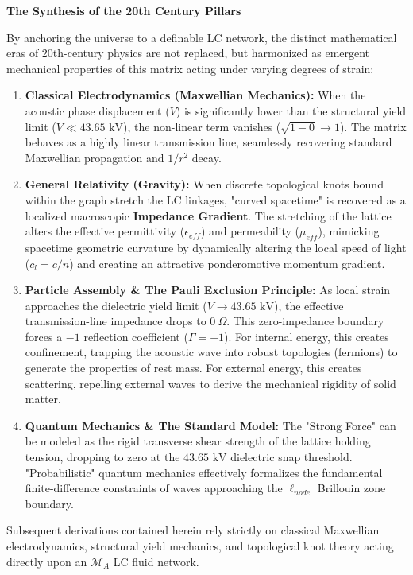 \vspace{1.5em}
\noindent \textbf{The Synthesis of the 20th Century Pillars}

\noindent By anchoring the universe to a definable LC network, the distinct mathematical eras of 20th-century physics are not replaced, but harmonized as emergent mechanical properties of this matrix acting under varying degrees of strain:
\begin{enumerate}
    \item \textbf{Classical Electrodynamics (Maxwellian Mechanics):} When the acoustic phase displacement ($V$) is significantly lower than the structural yield limit ($V \ll 43.65\text{ kV}$), the non-linear term vanishes ($\sqrt{1-0} \to 1$). The matrix behaves as a highly linear transmission line, seamlessly recovering standard Maxwellian propagation and $1/r^2$ decay.
    \item \textbf{General Relativity (Gravity):} When discrete topological knots bound within the graph stretch the LC linkages, "curved spacetime" is recovered as a localized macroscopic \textbf{Impedance Gradient}. The stretching of the lattice alters the effective permittivity ($\epsilon_{eff}$) and permeability ($\mu_{eff}$), mimicking spacetime geometric curvature by dynamically altering the local speed of light ($c_l = c/n$) and creating an attractive ponderomotive momentum gradient.
    \item \textbf{Particle Assembly \& The Pauli Exclusion Principle:} As local strain approaches the dielectric yield limit ($V \to 43.65\text{ kV}$), the effective transmission-line impedance drops to $0\ \Omega$. This zero-impedance boundary forces a $-1$ reflection coefficient ($\Gamma = -1$). For internal energy, this creates confinement, trapping the acoustic wave into robust topologies (fermions) to generate the properties of rest mass. For external energy, this creates scattering, repelling external waves to derive the mechanical rigidity of solid matter.
    \item \textbf{Quantum Mechanics \& The Standard Model:} The "Strong Force" can be modeled as the rigid transverse shear strength of the lattice holding tension, dropping to zero at the $43.65\text{ kV}$ dielectric snap threshold. "Probabilistic" quantum mechanics effectively formalizes the fundamental finite-difference constraints of waves approaching the $\ell_{node}$ Brillouin zone boundary.
\end{enumerate}

\vspace{1.5em}
\noindent Subsequent derivations contained herein rely strictly on classical Maxwellian electrodynamics, structural yield mechanics, and topological knot theory acting directly upon an $\mathcal{M}_A$ LC fluid network.

